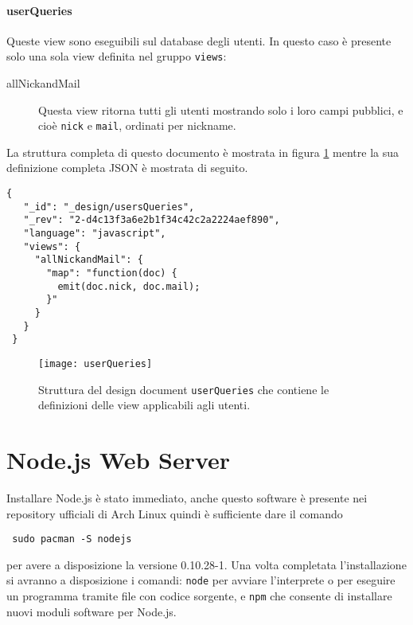                 \paragraph{userQueries} Queste view sono eseguibili sul
                database degli utenti. In questo caso è presente solo una sola
                view definita nel gruppo \texttt{views}:
                \begin{description}
                    \item[allNickandMail] Questa view ritorna tutti gli utenti
                    mostrando solo i loro campi pubblici, e cioè \texttt{nick}
                    e \texttt{mail}, ordinati per nickname.
                \end{description}
                La struttura completa di questo documento è mostrata in
                figura \ref{fig:userQueries} mentre la sua definizione completa
                JSON è mostrata di seguito.
                \begin{lstlisting}[language=plane]
 {
   "_id": "_design/usersQueries",
   "_rev": "2-d4c13f3a6e2b1f34c42c2a2224aef890",
   "language": "javascript",
   "views": {
     "allNickandMail": {
       "map": "function(doc) {
         emit(doc.nick, doc.mail);
       }"
     }
   }
 }
                \end{lstlisting}
                \begin{figure}[H]
                    \centering
                    \texttt{[image: userQueries]}
                    \caption{
                        Struttura del design document \texttt{userQueries} che
                        contiene le definizioni delle view applicabili agli
                        utenti.
                    }
                    \label{fig:userQueries}
                \end{figure}


    \section{Node.js Web Server}
    \label{sec:nodejs}
        Installare Node.js è stato immediato, anche questo software è
        presente nei repository ufficiali di Arch Linux quindi è sufficiente
        dare il comando
        \begin{lstlisting}
 sudo pacman -S nodejs
        \end{lstlisting}
        per avere a disposizione la versione 0.10.28-1. Una volta completata
        l'installazione si avranno a disposizione i comandi: \texttt{node}
        per avviare l'interprete o per eseguire un programma tramite file con
        codice sorgente, e \texttt{npm} che consente di installare nuovi
        moduli software per Node.js.

